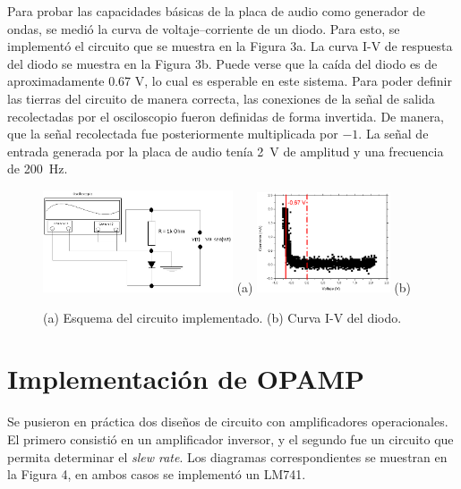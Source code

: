\documentclass[a4paper,10pt]{article}
\begin{document}
Para probar las capacidades básicas de la placa de audio como generador de ondas, se medió la curva de  voltaje--corriente de un diodo. Para esto, se implementó el circuito que se muestra en la Figura 3a. La curva I-V de respuesta del diodo se muestra en la Figura 3b. Puede verse que la caída del diodo es de aproximadamente 0.67 V, lo cual es esperable en este sistema. Para poder definir las tierras del circuito de manera correcta, las conexiones de la señal de salida recolectadas por el osciloscopio fueron definidas de forma invertida. De manera, que la señal recolectada fue posteriormente
multiplicada por $-1$. 
La señal de entrada generada por la placa de audio tenía 2~V de amplitud y una frecuencia de 200~Hz.


\begin{figure}[h!]
 \centering
 \includegraphics[width=0.5\textwidth]{circuit.jpg} (a)
 \hspace{0.1cm}
 \includegraphics[width=0.35\textwidth]{DidoVoltajeCorriente2.jpg} (b)
 \label{fig:diodo}
 \caption{(a) Esquema del circuito implementado. 
 (b) Curva I-V del diodo.}
\end{figure}


\section{Implementación de OPAMP}
\label{sec:opamp}

Se pusieron en práctica dos diseños de circuito con amplificadores 
operacionales. El primero consistió en un amplificador inversor, y el segundo fue un circuito que permita determinar el {\it slew rate}. Los diagramas correspondientes se muestran en la Figura 4, en ambos casos se implementó
un LM741.
\end{document}
